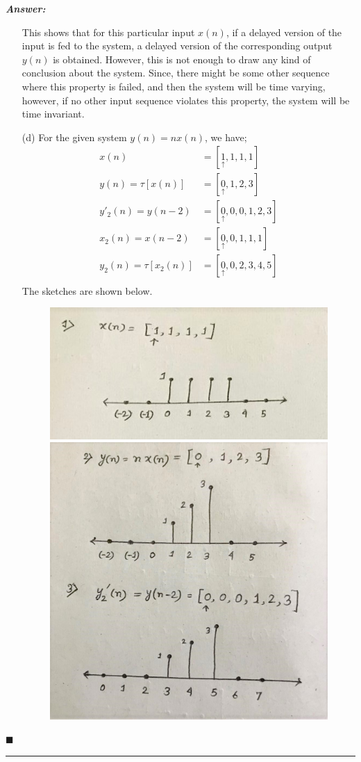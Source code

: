 \documentclass[12pt]{article}
\theoremstyle{definition}
\newenvironment{answer}{
    \textbf{\textit{Answer:}} \qquad
}{\hfill $\blacksquare$ \\ \begin{center}
    \rule{0.6\linewidth}{0.5px}    
\end{center}
}
\begin{document}
\begin{answer}
\begin{enumerate}
        This shows that for this particular input $x(n)$, if a delayed version of the input is fed to the system, a delayed version of the corresponding output $y(n)$ is obtained. However, this is not enough to draw any kind of conclusion about the system. Since, there might be some other sequence where this property is failed, and then the system will be time varying, however, if no other input sequence violates this property, the system will be time invariant.

        \item[(d)] For the given system $y(n) = nx(n)$, we have;
        \begin{align*}
            x(n) & = [\underset{\uparrow}{1}, 1, 1, 1]\\
            y(n) = \tau[x(n)] & = [\underset{\uparrow}{0}, 1, 2, 3]\\
            y'_2(n) = y(n-2) & = [\underset{\uparrow}{0}, 0, 0, 1, 2, 3]\\
            x_2(n) = x(n-2) & = [\underset{\uparrow}{0}, 0, 1, 1, 1]\\
            y_2(n) = \tau[x_2(n)] & = [\underset{\uparrow}{0}, 0, 2, 3, 4, 5]\\
        \end{align*} 
        The sketches are shown below.
        \begin{figure}[H]
            \centering
            \includegraphics[width= 0.55\linewidth]{q10_d_1.jpeg}
            \includegraphics[width= 0.55\linewidth]{q10_d_2.jpeg}
        \end{figure}


\end{enumerate}
\end{answer}
\end{document}
